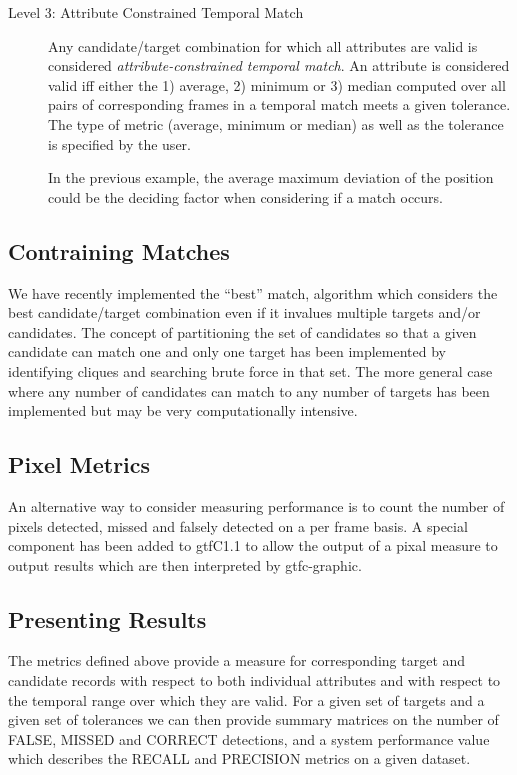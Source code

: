 \begin{description}
\item [Level 3: Attribute Constrained Temporal Match] \emptyline 
Any candidate/target combination for which all attributes are valid is
considered {\em attribute-constrained temporal match}.  An attribute
is considered valid iff either the 1) average, 2) minimum or 3) median
computed over all pairs of corresponding frames in a temporal match
meets a given tolerance.  The type of metric (average, minimum or median) as well as the tolerance is specified by the user.

In the previous example, the average maximum deviation of the position could be the deciding factor when considering if a match occurs.

\end{description}
\subsection{Contraining Matches}
\label{s:eval-contrain}

We have recently implemented the ``best'' match, algorithm which
considers the best candidate/target combination even if it invalues
multiple targets and/or candidates.  The concept of partitioning the
set of candidates so that a given candidate can match one and only one
target has been implemented by identifying cliques and searching brute
force in that set.  The more general case where any number of
candidates can match to any number of targets has been implemented but
may be very computationally intensive.

\subsection{Pixel Metrics}  

An alternative way to consider measuring performance is to count the
number of pixels detected, missed and falsely detected on a per frame
basis.  A special component has been added to gtfC1.1 to allow the
output of a pixal measure to output results which are then interpreted
by gtfc-graphic.

\subsection{Presenting Results}  

The metrics defined above provide a measure for corresponding target
and candidate records with respect to both individual attributes and
with respect to the temporal range over which they are valid. For a
given set of targets and a given set of tolerances we can then provide
summary matrices on the number of FALSE, MISSED and CORRECT
detections, and a system performance value which describes the RECALL
and PRECISION metrics on a given dataset.


